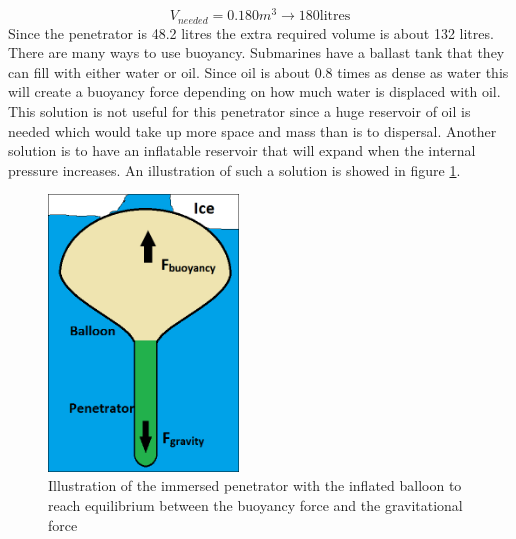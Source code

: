 \begin{equation}
V_{needed} = 0.180 m^3 \rightarrow 180 \text{litres}
\end{equation}
Since the penetrator is 48.2 litres the extra required volume is about 132 litres. There are many ways to use buoyancy. Submarines have a ballast tank that they can fill with either water or oil. Since oil is about 0.8 times as dense as water this will create a buoyancy force depending on how much water is displaced with oil. This solution is not useful for this penetrator since a huge reservoir of oil is needed which would take up more space and mass than is to dispersal. Another solution is to have an inflatable reservoir that will expand when the internal pressure increases. An illustration of such a solution is showed in figure \ref{fig:buoyancy1}.
\begin{figure}[htb]
  \centering
  \includegraphics[width=0.45\textwidth]{figures/Ricardo/Buoyancy1.png}
  \caption{Illustration of the immersed penetrator with the inflated balloon to reach equilibrium between the buoyancy force and the gravitational force}
  \label{fig:buoyancy1}
\end{figure}
